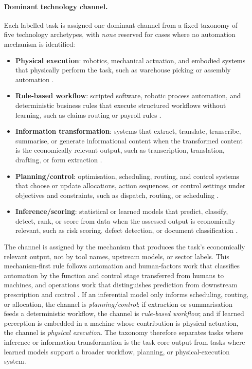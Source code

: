 \documentclass[11pt]{article}
\begin{document}
\paragraph{Dominant technology channel.} Each labelled task is assigned one dominant channel from a fixed taxonomy of five technology archetypes, with \textit{none} reserved for cases where no automation mechanism is identified:
\begin{itemize}[leftmargin=*,itemsep=0.1em,topsep=0.3em]
    \item \textbf{Physical execution}: robotics, mechanical actuation, and embodied systems that physically perform the task, such as warehouse picking or assembly automation \citep{graetz2018robots,acemoglu2020robots}.
    \item \textbf{Rule-based workflow}: scripted software, robotic process automation, and deterministic business rules that execute structured workflows without learning, such as claims routing or payroll rules \citep{AutorLevyMurnane2003,SyedEtAl2020RPA}.
    \item \textbf{Information transformation}: systems that extract, translate, transcribe, summarise, or generate informational content when the transformed content is the economically relevant output, such as transcription, translation, drafting, or form extraction \citep{EloundouEtAl2024,BrynjolfssonLiRaymond2023GenerativeAIatWork}.
    \item \textbf{Planning/control}: optimisation, scheduling, routing, and control systems that choose or update allocations, action sequences, or control settings under objectives and constraints, such as dispatch, routing, or scheduling \citep{BertsimasKallus2020PredictivePrescriptive,ParasuramanSheridanWickens2000Automation}.
    \item \textbf{Inference/scoring}: statistical or learned models that predict, classify, detect, rank, or score from data when the assessed output is economically relevant, such as risk scoring, defect detection, or document classification \citep{BrynjolfssonMitchellRock2018,Webb2020}.
\end{itemize}

The channel is assigned by the mechanism that produces the task's economically relevant output, not by tool names, upstream models, or sector labels. This mechanism-first rule follows automation and human-factors work that classifies automation by the function and control stage transferred from humans to machines, and operations work that distinguishes prediction from downstream prescription and control \citep{ParasuramanSheridanWickens2000Automation,EndsleyKaber1999,BertsimasKallus2020PredictivePrescriptive}. If an inferential model only informs scheduling, routing, or allocation, the channel is \textit{planning/control}; if extraction or summarisation feeds a deterministic workflow, the channel is \textit{rule-based workflow}; and if learned perception is embedded in a machine whose contribution is physical actuation, the channel is \textit{physical execution}. The taxonomy therefore separates tasks where inference or information transformation is the task-core output from tasks where learned models support a broader workflow, planning, or physical-execution system.
\end{document}

